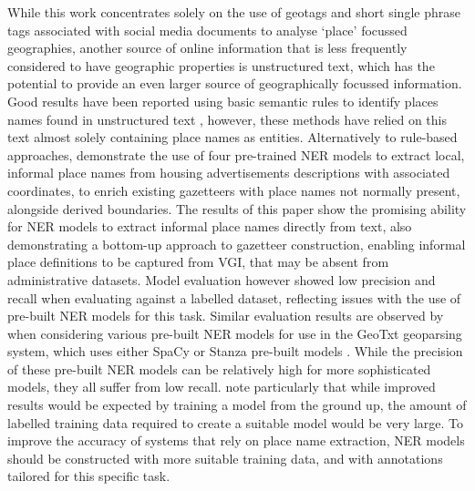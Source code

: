 \documentclass[]{interact}
\theoremstyle{plain}%
\theoremstyle{definition}
\theoremstyle{remark}
\begin{document}
While this work concentrates solely on the use of geotags and short
single phrase tags associated with social media documents to analyse
`place' focussed geographies, another source of online information that
is less frequently considered to have geographic properties is
unstructured text, which has the potential to provide an even larger
source of geographically focussed information. Good results have been
reported using basic semantic rules to identify places names found in
unstructured text \citep{moncla2014}, however, these methods have relied
on this text almost solely containing place names as entities.
Alternatively to rule-based approaches, \citet{hu2019} demonstrate the
use of four pre-trained NER models to extract local, informal place
names from housing advertisements descriptions with associated
coordinates, to enrich existing gazetteers with place names not normally
present, alongside derived boundaries. The results of this paper show
the promising ability for NER models to extract informal place names
directly from text, also demonstrating a bottom-up approach to gazetteer
construction, enabling informal place definitions to be captured from
VGI, that may be absent from administrative datasets. Model evaluation
however showed low precision and recall when evaluating against a
labelled dataset, reflecting issues with the use of pre-built NER models
for this task. Similar evaluation results are observed by
\citet{karimzadeh2019} when considering various pre-built NER models for
use in the GeoTxt geoparsing system, which uses either SpaCy or Stanza
pre-built models \citep{qi2018, honnibal2017}. While the precision of
these pre-built NER models can be relatively high for more sophisticated
models, they all suffer from low recall. \citet{karimzadeh2019} note
particularly that while improved results would be expected by training a
model from the ground up, the amount of labelled training data required
to create a suitable model would be very large. To improve the accuracy
of systems that rely on place name extraction, NER models should be
constructed with more suitable training data, and with annotations
tailored for this specific task.
\end{document}
